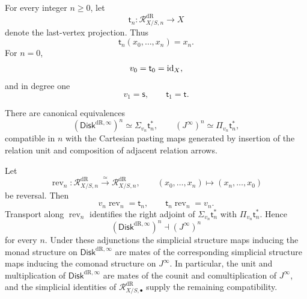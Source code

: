 \begin{proposition}
\label{prop:iterated-relation-correspondences}
For every integer \(n\geq0\), let
\[
  \mathsf t_n:\mathcal R^{\mathrm{dR}}_{X/S,n}\to X
\]
denote the last-vertex projection. Thus
\[
  \mathsf t_n(x_0,\ldots,x_n)=x_n.
\]
For \(n=0\),
\[
  v_0=\mathsf t_0=\operatorname{id}_X,
\]
and in degree one
\[
  v_1=\mathsf s,
  \qquad
  \mathsf t_1=\mathsf t.
\]

There are canonical equivalences
\[
  (\mathsf{Disk}^{\mathrm{dR},\infty})^n
  \simeq
  \Sigma_{v_n}\mathsf t_n^*,
  \qquad
  (J^\infty)^n
  \simeq
  \Pi_{v_n}\mathsf t_n^*,
\]
compatible in \(n\) with the Cartesian pasting maps generated by insertion of
the relation unit and composition of adjacent relation arrows.

Let
\[
  \operatorname{rev}_n:\mathcal R^{\mathrm{dR}}_{X/S,n}\xrightarrow{\simeq}\mathcal R^{\mathrm{dR}}_{X/S,n},
  \qquad
  (x_0,\ldots,x_n)\longmapsto(x_n,\ldots,x_0)
\]
be reversal. Then
\[
  v_n\operatorname{rev}_n=\mathsf t_n,
  \qquad
  \mathsf t_n\operatorname{rev}_n=v_n.
\]
Transport along \(\operatorname{rev}_n\) identifies the right adjoint of
\(\Sigma_{v_n}\mathsf t_n^*\) with
\(\Pi_{v_n}\mathsf t_n^*\). Hence
\[
  (\mathsf{Disk}^{\mathrm{dR},\infty})^n\dashv(J^\infty)^n
\]
for every \(n\). Under these adjunctions the simplicial structure maps
inducing the monad structure on \(\mathsf{Disk}^{\mathrm{dR},\infty}\) are mates of the corresponding
simplicial structure maps inducing the comonad structure on \(J^\infty\).
In particular, the unit and multiplication of \(\mathsf{Disk}^{\mathrm{dR},\infty}\) are mates of the
counit and comultiplication of \(J^\infty\), and the simplicial identities of
\(\mathcal R^{\mathrm{dR}}_{X/S,\bullet}\) supply the remaining compatibility.
\end{proposition}

